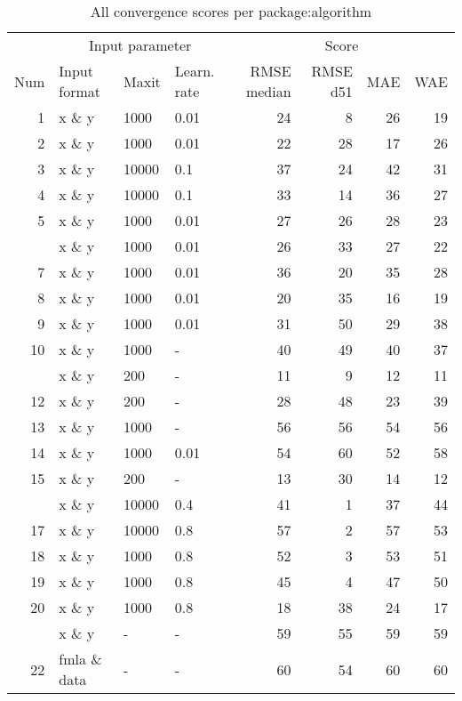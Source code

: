 \begin{Schunk}
\begin{table}

\caption{\label{tab:unnamed-chunk-3}All convergence scores per package:algorithm}
\centering
\fontsize{8}{10}\selectfont
\begin{tabular}[t]{rlllrrrr}
\toprule
\multicolumn{1}{c}{ } & \multicolumn{3}{c}{Input parameter} & \multicolumn{4}{c}{Score} \\
\cmidrule(l{3pt}r{3pt}){2-4} \cmidrule(l{3pt}r{3pt}){5-8}
Num & Input format & Maxit & Learn. rate & RMSE median & RMSE d51 & MAE & WAE\\
\midrule
1 & x \& y & 1000 & 0.01 & 24 & 8 & 26 & 19\\
2 & x \& y & 1000 & 0.01 & 22 & 28 & 17 & 26\\
3 & x \& y & 10000 & 0.1 & 37 & 24 & 42 & 31\\
4 & x \& y & 10000 & 0.1 & 33 & 14 & 36 & 27\\
5 & x \& y & 1000 & 0.01 & 27 & 26 & 28 & 23\\
\addlinespace
6 & x \& y & 1000 & 0.01 & 26 & 33 & 27 & 22\\
7 & x \& y & 1000 & 0.01 & 36 & 20 & 35 & 28\\
8 & x \& y & 1000 & 0.01 & 20 & 35 & 16 & 19\\
9 & x \& y & 1000 & 0.01 & 31 & 50 & 29 & 38\\
10 & x \& y & 1000 & - & 40 & 49 & 40 & 37\\
\addlinespace
11 & x \& y & 200 & - & 11 & 9 & 12 & 11\\
12 & x \& y & 200 & - & 28 & 48 & 23 & 39\\
13 & x \& y & 1000 & - & 56 & 56 & 54 & 56\\
14 & x \& y & 1000 & 0.01 & 54 & 60 & 52 & 58\\
15 & x \& y & 200 & - & 13 & 30 & 14 & 12\\
\addlinespace
16 & x \& y & 10000 & 0.4 & 41 & 1 & 37 & 44\\
17 & x \& y & 10000 & 0.8 & 57 & 2 & 57 & 53\\
18 & x \& y & 1000 & 0.8 & 52 & 3 & 53 & 51\\
19 & x \& y & 1000 & 0.8 & 45 & 4 & 47 & 50\\
20 & x \& y & 1000 & 0.8 & 18 & 38 & 24 & 17\\
\addlinespace
21 & x \& y & - & - & 59 & 55 & 59 & 59\\
22 & fmla \& data & - & - & 60 & 54 & 60 & 60\\

\end{tabular}
\end{table}
\end{Schunk}
